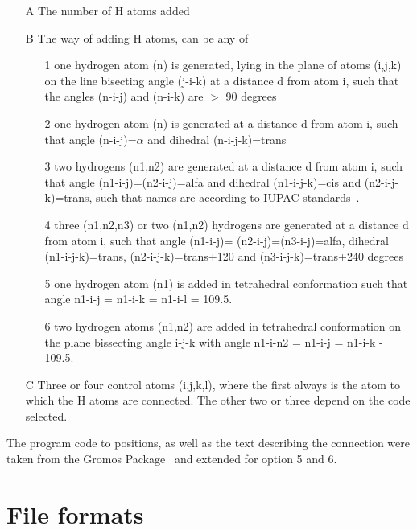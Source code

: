 \begin{itemize}
\item[A]        The number of H atoms added
\item[B]        The way of adding H atoms, can be any of
        \begin{enumerate}
        \item[1]        one hydrogen atom (n) is generated, lying in the plane 
                        of atoms (i,j,k) on the line bisecting angle (j-i-k)
                        at a distance d from atom i, such that the angles   
                        (n-i-j) and (n-i-k) are $>$ 90 degrees                
        \item[2]        one hydrogen atom (n) is generated at a distance d  
                        from atom i, such that angle (n-i-j)=$\alpha$ and 
                        dihedral (n-i-j-k)=trans
        \item[3]        two hydrogens (n1,n2) are generated at a distance d 
                        from atom i, such that angle (n1-i-j)=(n2-i-j)=alfa 
                        and dihedral (n1-i-j-k)=cis and (n2-i-j-k)=trans,
			such that names are according to IUPAC 
			standards~\cite{iupac70}.
        \item[4]        three (n1,n2,n3) or two (n1,n2) hydrogens are generated
                        at a distance d from atom i, such that angle (n1-i-j)= 
                        (n2-i-j)=(n3-i-j)=alfa, dihedral (n1-i-j-k)=trans,  
                        (n2-i-j-k)=trans+120 and (n3-i-j-k)=trans+240 degrees  
	\item[5]	one hydrogen atom (n1) is added 
			in tetrahedral conformation
			such that angle n1-i-j = n1-i-k = n1-i-l = 109.5.
	\item[6]	two hydrogen atoms (n1,n2) are added in tetrahedral
			conformation on the plane bissecting angle i-j-k
			with angle n1-i-n2 = n1-i-j = n1-i-k - 109.5.
        \end{enumerate}
\item[C]        Three or four control atoms (i,j,k,l), 
		where the first always is the atom
                to which the H atoms are connected. The other two or three 
		depend on the code selected.
\end{itemize}
The program code to  
positions, as well as the text 
describing the connection were taken from the Gromos Package~\cite{biomos} 
and extended for option 5 and 6.

\section{File formats}
